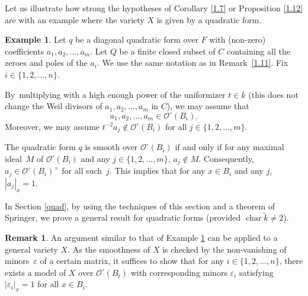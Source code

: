 \documentclass[JEP,XML,SOM,Unicode,NoFloatCountersInSection,published]{cedram}
\DeclareMathOperator{\Char}{char}
\let\epsilon\varepsilon
\theoremstyle{definition}
\newtheorem{rem}[thm]{Remark}
\newtheorem{ex}[thm]{Example}
\begin{document}
Let us illustrate how strong the hypotheses of Corollary \ref{1.7} or Proposition \ref{1.12} are with an example where the variety $X$ is given by a quadratic form.

\begin{ex} \label{1.8.1}
Let $q$ be a diagonal quadratic form over $F$ with (non-zero) coefficients ${a_1, a_2, \dots, a_m}$. Let $Q$ be a finite closed subset of $C$ containing all the zeroes and poles of the $a_i$. We use the same notation as in Remark~\ref{1.11}. Fix $i \in \{1,2,\dots, n\}$.

By~multiplying with a high enough power of the uniformizer $t \in k$ (this does not change the Weil divisors of $a_1, a_2, \dots, a_m$ in $C$), we may assume that
\[
{a_1, a_2, \dots, a_m \in \mathcal{O}^{\circ}(B_i)}.
\]
Moreover, we may assume ${t^{-2}a_j \not \in \mathcal{O}^{\circ}(B_i)}$ for all $j \in \{1, 2, \dots, m\}$.

The quadratic form $q$ is smooth over $\mathcal{O}^{\circ}(B_i)$ if and only if for any maximal ideal~$M$ of $\mathcal{O}^{\circ}(B_i)$ and any $j \in \{1,2,\dots, m\}$, $a_j \not \in M$. Consequently, $a_j \in \mathcal{O}^{\circ}(B_i)^{\times}$ for all such~$j$. This implies that for any $x \in B_i$ and any $j$, $|a_j|_x=1$.
\end{ex}

In Section \ref{quad}, by using the techniques of this section and a theorem of Springer, we prove a general result for quadratic forms (provided $\Char \widetilde{k} \neq 2$).

\begin{rem} \label{1.8.2} An argument similar to that of Example \ref{1.8.1} can be applied to a general variety $X$.
As the smoothness of $X$ is checked by the non-vanishing of minors~$\epsilon$ of a certain matrix, it suffices to show that for any $i \in \{1, 2, \dots, n\}$, there exists a model of $X$ over $\mathcal{O}^{\circ}(B_i)$ with corresponding minors $\epsilon_i$ satisfying $|\epsilon_i|_x=1$ for all $x \in B_i$.
\end{rem}
\end{document}
